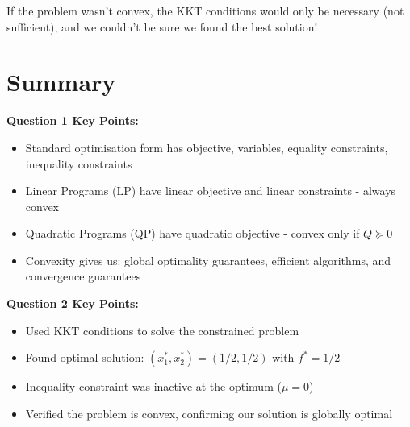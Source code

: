 \documentclass[11pt]{article}
\begin{document}
If the problem wasn't convex, the KKT conditions would only be necessary (not sufficient), and we couldn't be sure we found the best solution!

\vspace{2em}

\section{Summary}

\textbf{Question 1 Key Points:}
\begin{itemize}
\item Standard optimisation form has objective, variables, equality constraints, inequality constraints
\item Linear Programs (LP) have linear objective and linear constraints - always convex
\item Quadratic Programs (QP) have quadratic objective - convex only if $Q \succeq 0$
\item Convexity gives us: global optimality guarantees, efficient algorithms, and convergence guarantees
\end{itemize}

\textbf{Question 2 Key Points:}
\begin{itemize}
\item Used KKT conditions to solve the constrained problem
\item Found optimal solution: $(x_1^*, x_2^*) = (1/2, 1/2)$ with $f^* = 1/2$
\item Inequality constraint was inactive at the optimum ($\mu = 0$)
\item Verified the problem is convex, confirming our solution is globally optimal
\end{itemize}
\end{document}

